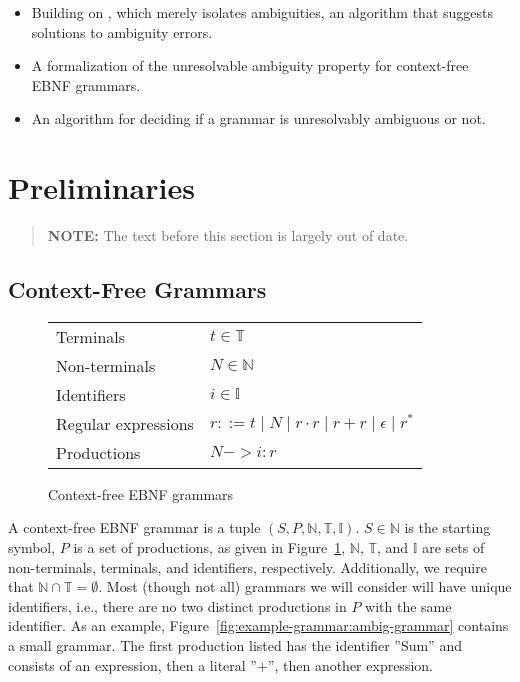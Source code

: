 \documentclass[sigplan]{acmart}\settopmatter{printfolios=true,printccs=false,printacmref=false}
\newcommand{\NT}{\mathbb{N}} %
\newcommand{\T}{\mathbb{T}} %
\newcommand{\I}{\mathbb{I}} %
\begin{document}
\begin{itemize}
  \item Building on \cite{palmkvistCreatingDomainSpecificLanguages2019}, which merely isolates ambiguities, an algorithm that suggests solutions to ambiguity errors.
  \item A formalization of the unresolvable ambiguity property for context-free EBNF grammars.
  \item An algorithm for deciding if a grammar is unresolvably ambiguous or not.
\end{itemize}

\section{Preliminaries}

\begin{quote} %
  \textbf{NOTE:} The text before this section is largely out of date.
\end{quote}

\subsection{Context-Free Grammars}

\begin{figure}
  \begin{tabular}{@{}ll@{}}
      Terminals & $t \in \T$ \\
      Non-terminals & $N \in \NT$ \\
      Identifiers & $i \in \I$ \\
      Regular expressions & $r ::= t \mid N \mid r \cdot r \mid r + r \mid \epsilon \mid r^{*}$ \\
      Productions & $N -> i : r$ \\
  \end{tabular}
  \caption{Context-free EBNF grammars}
  \label{fig:grammar-definition}
\end{figure}

A context-free EBNF grammar is a tuple $(S, P, \NT, \T, \I)$. $S \in \NT$ is the starting symbol, $P$ is a set of productions, as given in Figure~\ref{fig:grammar-definition}, $\NT$, $\T$, and $\I$ are sets of non-terminals, terminals, and identifiers, respectively. Additionally, we require that $\NT \cap \T = \emptyset$. Most (though not all) grammars we will consider will have unique identifiers, i.e., there are no two distinct productions in $P$ with the same identifier. As an example, Figure~\ref{fig:example-grammar:ambig-grammar} contains a small grammar. The first production listed has the identifier ''Sum'' and consists of an expression, then a literal ''+'', then another expression.
\end{document}

